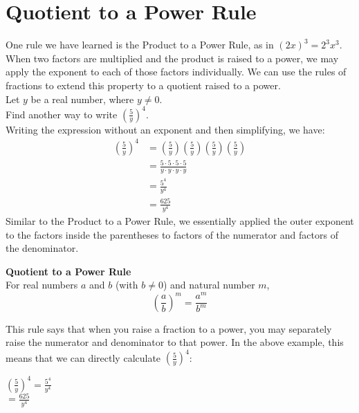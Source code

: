 \documentclass{ximera}
\begin{document}
\section{Quotient to a Power Rule}
  One rule we have learned is the Product to a Power Rule,
      as in $(2x)^{3}=2^{3}x^{3}$.
      When two factors are multiplied and the product is raised to a power,
      we may apply the exponent to each of those factors individually.
      We can use the rules of fractions to extend this property to a
      quotient raised to a power.\\
   Let $y$ be a real number, where $y \neq 0$.\\
          Find another way to write $\left(\frac{5}{y}\right)^4$.\\
     Writing the expression without an exponent and then simplifying, we have:
  \begin{align*}
            \left( \frac{5}{y} \right)^4 &= \left( \frac{5}{y} \right) \left( \frac{5}{y} \right) \left( \frac{5}{y} \right) \left( \frac{5}{y} \right)\\
            &= \frac{5 \cdot 5 \cdot 5 \cdot 5}{y \cdot y \cdot y \cdot y}\\
            &= \frac{5^4}{y^4}\\
            &= \frac{625}{y^4}
\end{align*}
        Similar to the Product to a Power Rule,
          we essentially applied the outer exponent to the factors
          inside the parentheses to factors of the numerator and
          factors of the denominator.
\begin{callout}
\textbf{ \Large Quotient to a Power Rule} \\
       For real numbers $a$ and $b$
          (with $b \neq 0$)
          and natural number $m$,
        $$
            \left( \frac{a}{b}  \right)^{m} = \frac{a^{m}}{b^{m}}
          $$
\end{callout}
 This rule says that when you raise a fraction to a power,
      you may separately raise the numerator and denominator to that power.
      In the above example,
      this means that we can directly calculate $\left( \frac{5}{y} \right)^4$:
   \begin{center}
        $\left( \frac{5}{y} \right)^4 = \frac{5^4}{y^4}$\\
        $=\frac{625}{y^4}$
\end{center}
\end{document}
